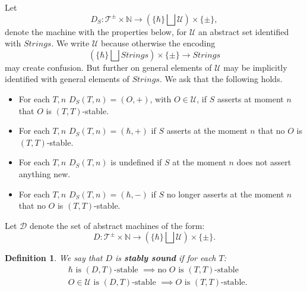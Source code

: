 \documentclass{amsart}  %
\numberwithin{equation}{section}
\newtheorem{definition}[equation]{Definition}
\theoremstyle{definition}
\theoremstyle{remark}
\begin{document}
{Let 
$$D _{S} : \mathcal{T} ^{\pm} \times \mathbb{N}  \to (\{\hbar\} \bigsqcup \mathcal{U}) \times \{\pm\},$$ denote the machine with the properties below,  for $\mathcal{U}$ an abstract set identified with $Strings$. We write $\mathcal{U}$ because otherwise the encoding $$(\{\hbar\} \bigsqcup Strings) \times \{\pm\} \to Strings$$ may create confusion. But further on general elements of $\mathcal{U}$ may be implicitly identified with general elements of $Strings$. We ask that the following holds.
\begin{itemize}
\item For each $T,n$ $D _{S} (T,n) = (O,+)$, with $O \in \mathcal{U}$, if $S$ asserts at moment $n$
that $O$ is $(T,T)$-stable.
  \item  For each $T,n$ $D _{S} (T,n) = (\hbar,+)$ if $S$ asserts at the moment $n$ that no $O$ is $(T,T)$-stable.   
\item For each $T,n$ $D _{S} (T,n)$ is undefined if $S$ at the moment $n$ does not assert anything new.
\item    For each $T,n$ $D _{S} (T,n) = (\hbar,-)$ if $S$ no longer asserts at the moment $n$ that no $O$ is $(T,T)$-stable.   
\end{itemize} 
Let $\mathcal{D}$ denote the set of abstract machines of the form:
$$D: \mathcal{T} ^{\pm} \times \mathbb{N}  \to (\{\hbar\} \bigsqcup \mathcal{U}) \times \{\pm\}.
$$ 
\begin{definition} 
We say that $D$ is \textbf{\emph{stably sound}} if for each $T$:
\begin{align*}
& \hbar \text{ is $(D,T)$-stable }  \implies \text{no $O$ is $(T,T)$-stable} \\
& O \in \mathcal{U} \text{ is $(D,T)$-stable } \implies \text{$O$ is $(T,T)$-stable}. 
\end{align*}


\end{definition}}
\end{document}
